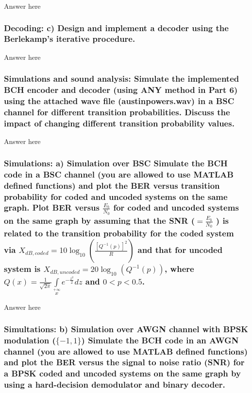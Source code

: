 \documentclass[a4paper]{report}
\begin{document}
Answer here \\

\subsubsection*{Decoding: c) Design and implement a decoder using the Berlekamp’s iterative procedure.}

Answer here \\

\subsubsection*{Simulations and sound analysis: Simulate the implemented BCH encoder and decoder (using ANY method in Part 6) using the attached wave file (austinpowers.wav) in a BSC channel for different transition probabilities. Discuss the impact of changing different transition probability values.}

Answer here \\

\subsubsection*{Simulations: a) Simulation over BSC Simulate the BCH code in a BSC channel (you are allowed to use MATLAB defined functions) and plot the BER versus transition probability for coded and uncoded systems on the same graph. Plot BER versus $\frac{E_b}{N_0}$ for coded and uncoded systems on the same graph by assuming that the SNR ($ = \frac{E_b}{N_0}$ ) is related to the transition probability for the coded system via $X_{dB,coded} = 10 \log_{10}(\frac{[Q^{−1} (p)]^2}{R}) $ and that for uncoded system is $X_{dB,uncoded} = 20\log_{10}(Q^{−1} (p)) $, where $Q(x) = \frac{1}{\sqrt{2 \pi}} \int\limits_{x}\limits^{+\infty} e^{ -\frac{z^2}{2}} dz $ and $0 < p < 0.5$.}

Answer here \\

\subsubsection*{Simultations: b) Simulation over AWGN channel with BPSK modulation ($\{−1, 1\}$) Simulate the BCH code in an AWGN channel (you are allowed to use MATLAB defined functions) and plot the BER versus the signal to noise ratio (SNR) for a BPSK coded and uncoded
systems on the same graph by using a hard-decision demodulator and binary decoder.}
\end{document}
